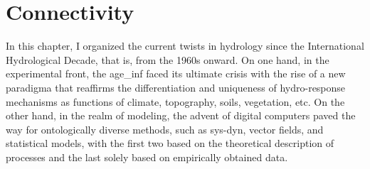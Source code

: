 \documentclass[./main_en.tex]{subfiles}
\begin{document}
\section{Connectivity}

\par In this chapter, I organized the current twists in \gls{hydrology} since the International Hydrological Decade, that is, from the 1960s onward. On one hand, in the experimental front, the \gls{age_inf} faced its ultimate crisis with the rise of a new \gls{paradigma} that reaffirms the differentiation and uniqueness of \gls{hydro-response} mechanisms as functions of climate, topography, soils, vegetation, etc. On the other hand, in the realm of modeling, the advent of digital computers paved the way for ontologically diverse methods, such as \gls{sys-dyn}, vector fields, and statistical models, with the first two based on the theoretical description of processes and the last solely based on empirically obtained data.
\end{document}
